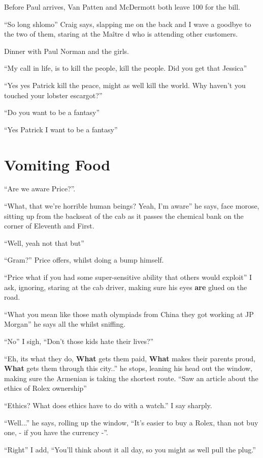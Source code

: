 \documentclass[19pt,openany]{book}
\begin{document}
Before Paul arrives,
Van Patten and McDermott
both leave 100 for the
bill.

``So long shlomo'' Craig
says, slapping me on the
back and I wave a goodbye
to the two of them, staring
at the Maître d who is
attending other customers.

Dinner with Paul Norman
and the girls.

``My call in life,
is to kill the people,
kill the people. Did
you get that Jessica''

``Yes yes Patrick kill the peace,
might as well kill the world.
Why haven't you touched your
lobster escargot?''

``Do you want to be a fantasy''

``Yes Patrick I want to be a fantasy''

\chapter{Vomiting Food}

``Are we aware Price?''.

``What, that we're
horrible human beings?
Yeah, I'm aware'' he
says, face morose, sitting up
from the backseat of the cab
as it passes the chemical bank
on the corner of Eleventh
and First.

``Well, yeah not
that but''

``Gram?'' Price offers,
whilst doing a bump himself.

``Price what if you had
some super-sensitive ability
that others would exploit'' I ask,
ignoring, staring at the cab driver,
making sure his eyes \textbf{are} glued on the road.

``What you mean like those
math olympiads from China they got working at
JP Morgan'' he says
all the whilst sniffing.


``No'' I sigh, ``Don't those
kids hate their lives?''

``Eh, its what they do,
\textbf{What} gets them paid,
\textbf{What} makes
their parents proud, \textbf{What}
gets them through this city..'' he
stops, leaning his head out
the window, making sure the Armenian
is taking
the shortest route. ``Saw
an article about the ethics
of Rolex ownership''

``Ethics? What does ethics
have to do with a watch.'' I say
sharply.

``Well...'' he says, rolling
up the window, ``It's
easier to buy a Rolex,
than not buy one, - if you
have the currency -''.

``Right'' I add, ``You'll
think about it all day, so
you might as well pull the
plug.''
\end{document}
